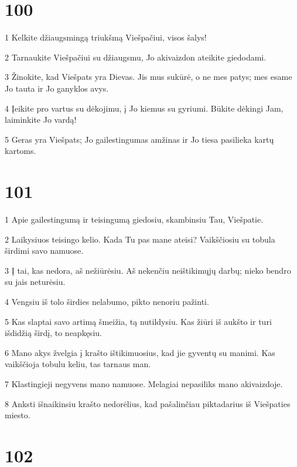 \chapter{100}


\par 1 Kelkite džiaugsmingą triukšmą Viešpačiui, visos šalys! 
\par 2 Tarnaukite Viešpačiui su džiaugsmu, Jo akivaizdon ateikite giedodami. 
\par 3 Žinokite, kad Viešpats yra Dievas. Jis mus sukūrė, o ne mes patys; mes esame Jo tauta ir Jo ganyklos avys. 
\par 4 Įeikite pro vartus su dėkojimu, į Jo kiemus su gyriumi. Būkite dėkingi Jam, laiminkite Jo vardą! 
\par 5 Geras yra Viešpats; Jo gailestingumas amžinas ir Jo tiesa pasilieka kartų kartoms.


\chapter{101}


\par 1 Apie gailestingumą ir teisingumą giedosiu, skambinsiu Tau, Viešpatie. 
\par 2 Laikysiuos teisingo kelio. Kada Tu pas mane ateisi? Vaikščiosiu su tobula širdimi savo namuose. 
\par 3 Į tai, kas nedora, aš nežiūrėsiu. Aš nekenčiu neištikimųjų darbų; nieko bendro su jais neturėsiu. 
\par 4 Vengsiu iš tolo širdies nelabumo, pikto nenoriu pažinti. 
\par 5 Kas slaptai savo artimą šmeižia, tą nutildysiu. Kas žiūri iš aukšto ir turi išdidžią širdį, to neapkęsiu. 
\par 6 Mano akys žvelgia į krašto ištikimuosius, kad jie gyventų su manimi. Kas vaikščioja tobulu keliu, tas tarnaus man. 
\par 7 Klastingieji negyvens mano namuose. Melagiai nepasiliks mano akivaizdoje. 
\par 8 Anksti išnaikinsiu krašto nedorėlius, kad pašalinčiau piktadarius iš Viešpaties miesto.


\chapter{102}


